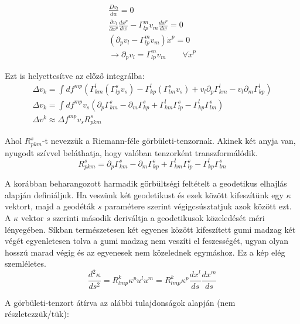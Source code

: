 \documentclass[a4paper,12pt]{article}
\begin{document}
\begin{align*}
    \frac{Dv_{l}}{dw} = 0 \\
    \frac{\partial v_{l}}{\partial x^{p}}\frac{dx^{p}}{dw} - \Gamma_{lp}^{m}v_{m}\frac{dx^{p}}{dw} = 0 \\
    (\partial_{p}v_{l} - \Gamma_{lp}^{m}v_{m})\dot{x}^{p} = 0 \\
    \rightarrow \partial_{p}v_{l} = \Gamma_{lp}^{m}v_{m} \quad \quad \forall \dot{x}^{p} 
\end{align*}
\par Ezt is helyettesítve az előző integrálba:
\begin{gather*}
    \Delta v_{k} = \int df^{mp}(\Gamma_{km}^{l}(\Gamma_{lp}^{s}v_{s}) - \Gamma_{kp}^{l}(\Gamma_{lm}^{s}v_{s}) + v_{l}\partial_{p}\Gamma_{km}^{l} - v_{l}\partial_{m}\Gamma_{kp}^{l}) \\
    \Delta v_{k} = \int df^{mp}v_{s}(\partial_{p}\Gamma_{km}^{s} - \partial_{m}\Gamma_{kp}^{s} + \Gamma_{km}^{l}\Gamma_{lp}^{s} - \Gamma_{kp}^{l}\Gamma_{lm}^{s}) \\
    \Delta v^{k} \approx \Delta f^{mp} v_{s} R_{pkm}^{s}
\end{gather*}
\par Ahol $R_{pkm}^{s}$-t nevezzük a Riemann-féle görbületi-tenzornak. Akinek két anyja van, nyugodt szívvel beláthatja, hogy valóban tenzorként transzformálódik.
\begin{equation*}
    R_{pkm}^{s} = \partial_{p}\Gamma_{km}^{s} - \partial_{m}\Gamma_{kp}^{s} + \Gamma_{km}^{l}\Gamma_{lp}^{s} - \Gamma_{kp}^{l}\Gamma_{lm}^{s}
\end{equation*}
\par A korábban beharangozott harmadik görbültségi feltételt a geodetikus elhajlás alapján definiáljuk. Ha veszünk két geodetikust és ezek között kifeszítünk egy $\kappa$ vektort, majd a geodéták $s$ paramétere szerint végigcsúsztatjuk azok között ezt. A $\kappa$ vektor $s$ szerinti második deriváltja a geodetikusok közeledését méri lényegében. Síkban természetesen két egyenes között kifeszített gumi madzag két végét egyenletesen tolva a gumi madzag nem veszíti el feszességét, ugyan olyan hosszú marad végig és az egyenesek nem közelednek egymáshoz. Ez a kép elég szemléletes.
\begin{equation*}
    \frac{d^{2}\kappa}{ds^{2}} = R_{lmp}^{k}\kappa^{p}u^{l}u^{m} = R_{lmp}^{k}\kappa^{p}\frac{dx^{l}}{ds}\frac{dx^{m}}{ds}
\end{equation*}
\par A görbületi-tenzort átírva az alábbi tulajdonságok alapján (nem részletezzük/tük):
\end{document}
